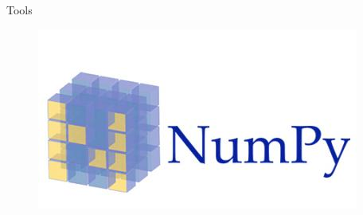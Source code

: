 \documentclass[xcolor=x11names,compress]{beamer}
\renewcommand{\(}{\begin{columns}}
\renewcommand{\)}{\end{columns}}
\newcommand{\<}[1]{\begin{column}{#1}}
\renewcommand{\>}{\end{column}}
\begin{document}
\begin{frame}{Tools}
\begin{itemize}
{		    \begin{figure}
		    \centring
                    \begin{minipage}{.3\textwidth}
                    \includegraphics[width=\linewidth]{numpy.png}
                    \label{fig:test2}
                    \end{minipage}\hfill
 
		    \end{figure}

}
\end{itemize}
\end{frame}
\end{document}
